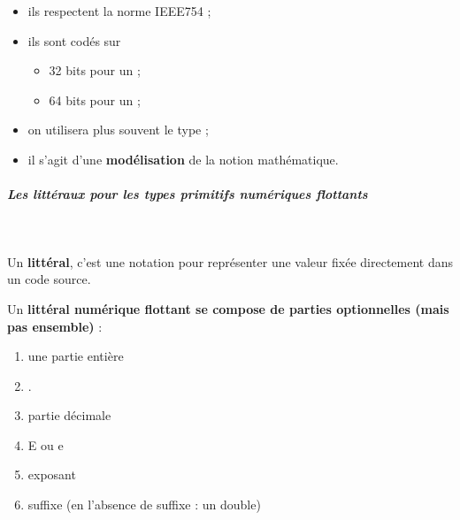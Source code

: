 \documentclass[11pt,a4paper]{article}
\begin{document}
					\begin{itemize}
				
			\item ils respectent la norme IEEE754 ;
			\item  ils sont cod\'es sur 
              
					\begin{itemize}
				
			\item  32 bits pour un \verb@float@ ;
			\item  64 bits pour un \verb@double@ ;
					\end{itemize}
				
			\item on utilisera plus souvent le type \verb@double@ ;
			\item il s'agit d'une \textbf{mod\'elisation} de la notion math\'ematique.
					\end{itemize}
				
            \par
        
			
		\subparagraph{Les litt\'eraux pour les types primitifs num\'eriques flottants} 
		
					\textcolor{white}{.} \par
				
            \par
        
          Un \textbf{litt\'eral}, c'est une notation pour repr\'esenter une valeur fix\'ee directement dans un code  source.
        
            \par
        
          Un \textbf{litt\'eral num\'erique flottant se compose de parties optionnelles (mais pas ensemble)} :
            
					\begin{enumerate}
				
			\item une partie enti\`ere
			\item .
			\item partie d\'ecimale
			\item E ou e
			\item exposant
			\item suffixe (en l'absence de suffixe : un double)
					\end{enumerate}
				
            \par
        
\end{document}
